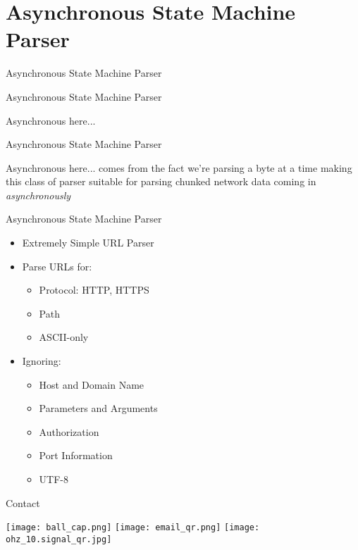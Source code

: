 \documentclass[aspectratio=169]{beamer}
\begin{document}
\section{Asynchronous State Machine Parser}
\begin{frame}
\begin{center}
\begin{Large}
Asynchronous State Machine Parser
\end{Large}
\end{center}
\end{frame}

\begin{frame}{Asynchronous State Machine Parser}
\begin{block}{Asynchronous here...}
\end{block}
\end{frame}

\begin{frame}{Asynchronous State Machine Parser}
\begin{block}{Asynchronous here...} comes from the fact we're parsing a byte at a time making this class of parser suitable for parsing chunked network data coming in \emph{asynchronously}
\end{block}
\end{frame}

\begin{frame}{Asynchronous State Machine Parser}
\begin{itemize}
\item Extremely Simple URL Parser
\item Parse URLs for:
	\begin{itemize}
	\item Protocol: {HTTP, HTTPS}
	\item Path
	\item ASCII-only
	\end{itemize}
\item Ignoring:
	\begin{itemize}
	\item Host and Domain Name
	\item Parameters and Arguments
	\item Authorization
	\item Port Information
	\item UTF-8
	\end{itemize}
\end{itemize}
\end{frame}

\begin{frame}{Contact}
\begin{center}
\texttt{[image: ball\_cap.png]}
\texttt{[image: email\_qr.png]}
\texttt{[image: ohz\_10.signal\_qr.jpg]}
\end{center}
\end{frame}
\end{document}
